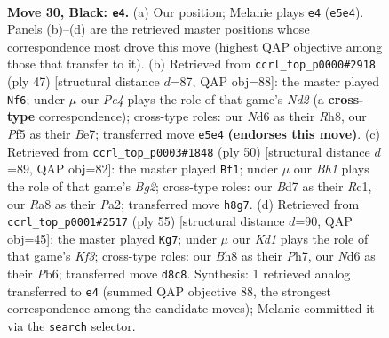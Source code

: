 \documentclass[11pt]{article}
\begin{document}
\clearpage

\begin{figure}[p]\centering
\begin{subfigure}{0.46\textwidth}\centering
\resizebox{\linewidth}{!}{%
\newchessgame
\chessboard[
  setfen={r2kr2b/2pb4/pp1n3B/P2Npp2/7R/1B3N2/1P2KPP1/R7 b - - 0 30},
  showmover=false,
  pgfstyle=straightmove, color=movearrow, markmove={e5-e4}
]}
\caption{}
\end{subfigure}\hfill
\begin{subfigure}{0.46\textwidth}\centering
\resizebox{\linewidth}{!}{%
\newchessgame
\chessboard[
  setfen={r3k2r/3nb1p1/p1Rp4/3Ppp2/2N4p/4BPP1/P4K1P/1R6 b kq - 1 24},
  showmover=false,
  pgfstyle=straightmove, color=movearrow, markmove={d7-f6}
]}
\caption{}
\end{subfigure}
\\[4pt]
\begin{subfigure}{0.46\textwidth}\centering
\resizebox{\linewidth}{!}{%
\newchessgame
\chessboard[
  setfen={5rk1/1p6/2p1n1pp/p1Pr1b2/1P3P2/5NPP/P4KB1/2R4R w - - 0 26},
  showmover=false,
  pgfstyle=straightmove, color=movearrow, markmove={g2-f1}
]}
\caption{}
\end{subfigure}\hfill
\begin{subfigure}{0.46\textwidth}\centering
\resizebox{\linewidth}{!}{%
\newchessgame
\chessboard[
  setfen={5r2/p2r3p/1pN1nkp1/3p1b2/3P3P/2N1R3/PP3P2/2R3K1 b - - 4 28},
  showmover=false,
  pgfstyle=straightmove, color=movearrow, markmove={f6-g7}
]}
\caption{}
\end{subfigure}
\caption{\textbf{Move 30, Black: \texttt{e4}.} (a) Our position; Melanie plays \texttt{e4} (\texttt{e5e4}). Panels (b)--(d) are the retrieved master positions whose correspondence most drove this move (highest QAP objective among those that transfer to it). (b) Retrieved from \texttt{ccrl\_top\_p0000\#2918} (ply 47) [structural distance $d$=87, QAP obj=88]: the master played \texttt{Nf6}; under $\mu$ our \emph{Pe4} plays the role of that game's \emph{Nd2} (a \textbf{cross-type} correspondence); cross-type roles: our \emph{N}d6 as their \emph{R}h8, our \emph{P}f5 as their \emph{B}e7; transferred move \texttt{e5e4} \textbf{(endorses this move)}. (c) Retrieved from \texttt{ccrl\_top\_p0003\#1848} (ply 50) [structural distance $d$=89, QAP obj=82]: the master played \texttt{Bf1}; under $\mu$ our \emph{Bh1} plays the role of that game's \emph{Bg2}; cross-type roles: our \emph{B}d7 as their \emph{R}c1, our \emph{R}a8 as their \emph{P}a2; transferred move \texttt{h8g7}. (d) Retrieved from \texttt{ccrl\_top\_p0001\#2517} (ply 55) [structural distance $d$=90, QAP obj=45]: the master played \texttt{Kg7}; under $\mu$ our \emph{Kd1} plays the role of that game's \emph{Kf3}; cross-type roles: our \emph{B}h8 as their \emph{P}h7, our \emph{N}d6 as their \emph{P}b6; transferred move \texttt{d8c8}. Synthesis: 1 retrieved analog transferred to \texttt{e4} (summed QAP objective 88, the strongest correspondence among the candidate moves); Melanie committed it via the \texttt{search} selector.}
\label{fig:thought-m59}
\end{figure}
\end{document}
